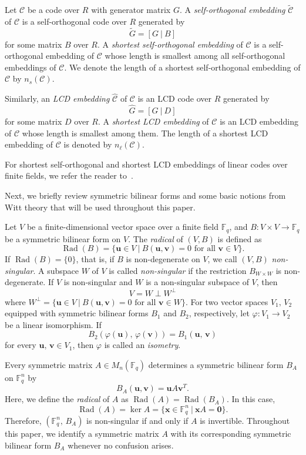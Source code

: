 \documentclass{article}
\theoremstyle{definition}
\theoremstyle{remark}
\begin{document}
Let $\mathcal{C}$ be a code over $R$ with generator matrix $G$. A \textit{self-orthogonal embedding} $\tilde{\mathcal{C}}$ of $\mathcal{C}$ is a self-orthogonal code over $R$ generated by
\[
\tilde{G}=[G~|~B]
\]
for some matrix $B$ over $R$. A \textit{shortest self-orthogonal embedding} of $\mathcal{C}$ is a self-orthogonal embedding of $\mathcal{C}$ whose length is smallest among all self-orthogonal embeddings of $\mathcal{C}$. We denote the length of a shortest self-orthogonal embedding of $\mathcal{C}$ by $n_s(\mathcal{C})$.

Similarly, an \textit{LCD embedding} $\hat{\mathcal{C}}$ of $\mathcal{C}$ is an LCD code over $R$ generated by
\[
\hat{G}=[G~|~D]
\]
for some matrix $D$ over $R$. A \textit{shortest LCD embedding} of $\mathcal{C}$ is an LCD embedding of $\mathcal{C}$ whose length is smallest among them. The length of a shortest LCD embedding of $\mathcal{C}$ is denoted by $n_\ell(\mathcal{C})$.

For shortest self-orthogonal and shortest LCD embeddings of linear codes over finite fields, we refer the reader to~\cite{A-2026,AKKLW-arXiv1,WL-2026}.

Next, we briefly review symmetric bilinear forms and some basic notions from Witt theory that will be used throughout this paper. 

Let $V$ be a finite-dimensional vector space over a finite field $\mathbb{F}_q$, and $B:V\times V\to \mathbb{F}_q$ be a symmetric bilinear form on $V$. The \textit{radical} of $(V, B)$ is defined as
\[
\operatorname{Rad}(B)=\{\mathbf{u}\in V~|~B(\mathbf{u}, \mathbf{v})=0\mbox{ for all }\mathbf{v}\in V\}.
\]
If $\operatorname{Rad}(B)=\{0\}$, that is, if $B$ is non-degenerate on $V$, we call $(V, B)$ \textit{non-singular}. A subspace $W$ of $V$ is called \textit{non-singular} if the restriction $B_{W\times W}$ is non-degenerate. If $V$ is non-singular and $W$ is a non-singular subspace of $V$, then
\[
V=W\perp W^\perp
\]
where $W^\perp=\{\mathbf{u}\in V~|~B(\mathbf{u}, \mathbf{v})=0\mbox{ for all }\mathbf{v}\in W\}$. For two vector spaces $V_1,\,V_2$ equipped with symmetric bilinear forms $B_1$ and $B_2$, respectively, let $\varphi:V_1\to V_2$ be a linear isomorphism. If
\[
B_2(\varphi(\mathbf{u}),\,\varphi(\mathbf{v}))=B_1(\mathbf{u},\,\mathbf{v})
\]
for every $\mathbf{u},\,\mathbf{v}\in V_1$, then $\varphi$ is called an \textit{isometry}.

Every symmetric matrix $A\in M_n(\mathbb{F}_q)$ determines a symmetric bilinear
form $B_A$ on $\mathbb{F}_q^n$ by
\[
B_A(\mathbf{u},\mathbf{v})=\mathbf{u}A\mathbf{v}^T.
\]
Here, we define the \textit{radical} of $A$ as $\operatorname{Rad}(A)=\operatorname{Rad}(B_A)$. In this case,
\[
\operatorname{Rad}(A)=\ker A=\{\mathbf{x}\in \mathbb{F}_q^n~|~\mathbf{x}A=\mathbf{0}\}.
\]
Therefore, $(\mathbb{F}_q^n,\,B_A)$ is non-singular if and only if $A$ is invertible. Throughout this paper, we identify a symmetric matrix $A$ with its corresponding symmetric bilinear form $B_A$ whenever no confusion arises.
\end{document}
